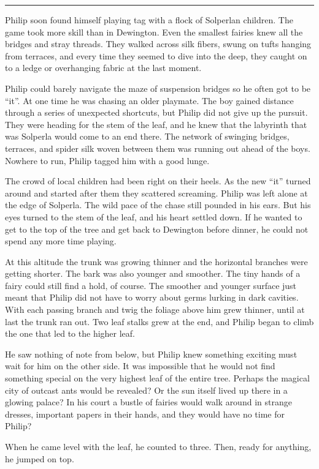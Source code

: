 \documentclass[10pt, draft]{memoir}
\renewcommand{\pfbreakdisplay}{\bigskip \ding{166} \bigskip}
\newcommand{\secbreak}{\fancybreak{\pfbreakdisplay}}
\begin{document}
\secbreak

Philip soon found himself playing tag with a flock of Solperlan children. The
game took more skill than in Dewington. Even the smallest fairies knew all the
bridges and stray threads. They walked across silk fibers, swung on tufts
hanging from terraces, and every time they seemed to dive into the deep, they
caught on to a ledge or overhanging fabric at the last moment.

Philip could barely navigate the maze of suspension bridges so he often got to
be ``it''. At one time he was chasing an older playmate. The boy gained
distance through a series of unexpected shortcuts, but Philip did not give up
the pursuit. They were heading for the stem of the leaf, and he knew that the
labyrinth that was Solperla would come to an end there. The network of swinging
bridges, terraces, and spider silk woven between them was running out ahead of
the boys. Nowhere to run, Philip tagged him with a good lunge.

The crowd of local children had been right on their heels. As the new ``it''
turned around and started after them they scattered screaming. Philip was left
alone at the edge of Solperla. The wild pace of the chase still pounded in his
ears. But his eyes turned to the stem of the leaf, and his heart settled down.
If he wanted to get to the top of the tree and get back to Dewington before
dinner, he could not spend any more time playing.

At this altitude the trunk was growing thinner and the horizontal branches were
getting shorter. The bark was also younger and smoother. The tiny hands of a
fairy could still find a hold, of course. The smoother and younger surface just
meant that Philip did not have to worry about germs lurking in dark cavities.
With each passing branch and twig the foliage above him grew thinner, until at
last the trunk ran out. Two leaf stalks grew at the end, and Philip began to
climb the one that led to the higher leaf.

He saw nothing of note from below, but Philip knew something exciting must wait
for him on the other side. It was impossible that he would not find something
special on the very highest leaf of the entire tree. Perhaps the magical city
of outcast ants would be revealed? Or the sun itself lived up there in a
glowing palace? In his court a bustle of fairies would walk around in strange
dresses, important papers in their hands, and they would have no time for
Philip?

When he came level with the leaf, he counted to three. Then, ready for
anything, he jumped on top.
\end{document}
